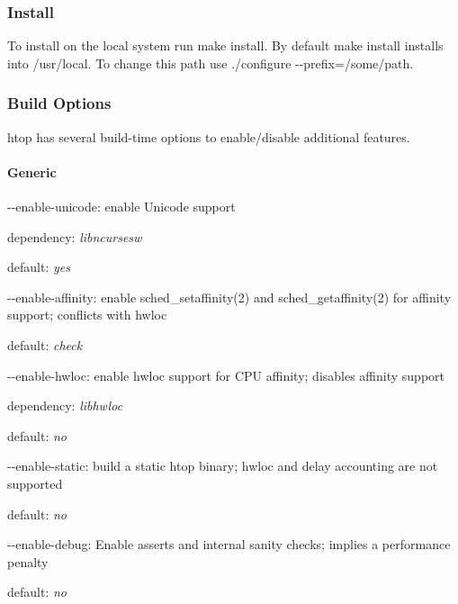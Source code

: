 \subsubsection*{Install}

To install on the local system run {\ttfamily make install}. By default {\ttfamily make install} installs into {\ttfamily /usr/local}. To change this path use {\ttfamily ./configure -\/-\/prefix=/some/path}.

\subsubsection*{Build Options}

{\ttfamily htop} has several build-\/time options to enable/disable additional features.

\paragraph*{Generic}


\begin{DoxyItemize}
\item {\ttfamily -\/-\/enable-\/unicode}\+: enable Unicode support
\begin{DoxyItemize}
\item dependency\+: {\itshape libncursesw}
\item default\+: {\itshape yes}
\end{DoxyItemize}
\item {\ttfamily -\/-\/enable-\/affinity}\+: enable {\ttfamily sched\+\_\+setaffinity(2)} and {\ttfamily sched\+\_\+getaffinity(2)} for affinity support; conflicts with hwloc
\begin{DoxyItemize}
\item default\+: {\itshape check}
\end{DoxyItemize}
\item {\ttfamily -\/-\/enable-\/hwloc}\+: enable hwloc support for C\+PU affinity; disables affinity support
\begin{DoxyItemize}
\item dependency\+: {\itshape libhwloc}
\item default\+: {\itshape no}
\end{DoxyItemize}
\item {\ttfamily -\/-\/enable-\/static}\+: build a static htop binary; hwloc and delay accounting are not supported
\begin{DoxyItemize}
\item default\+: {\itshape no}
\end{DoxyItemize}
\item {\ttfamily -\/-\/enable-\/debug}\+: Enable asserts and internal sanity checks; implies a performance penalty
\begin{DoxyItemize}
\item default\+: {\itshape no}
\end{DoxyItemize}
\end{DoxyItemize}

